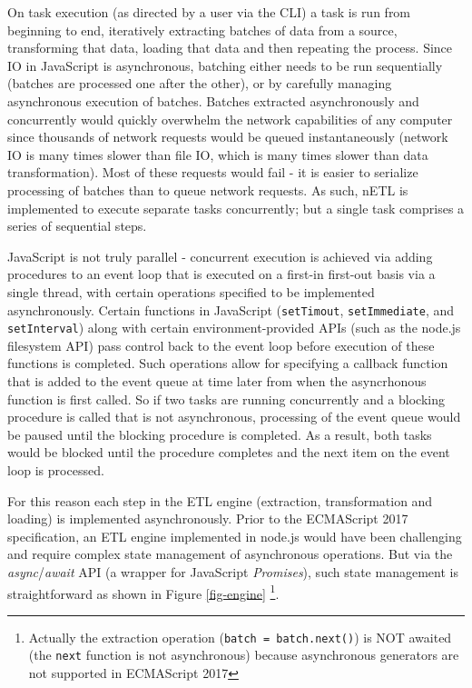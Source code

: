 On task execution (as directed by a user via the CLI) a task is run from beginning to end, iteratively extracting batches of data from a source, transforming that data, loading that data and then repeating the process. Since IO in JavaScript is asynchronous, batching either needs to be run sequentially (batches are processed one after the other), or by carefully managing asynchronous execution of batches. Batches extracted asynchronously and concurrently would quickly overwhelm the network capabilities of any computer since thousands of network requests would be queued instantaneously (network IO is many times slower than file IO, which is many times slower than data transformation). Most of these requests would fail - it is easier to serialize processing of batches than to queue network requests. As such, nETL is implemented to execute separate tasks concurrently; but a single task comprises a series of sequential steps.

JavaScript is not truly parallel - concurrent execution is achieved via adding procedures to an event loop that is executed on a first-in first-out basis via a single thread, with certain operations specified to be implemented asynchronously. Certain functions in JavaScript (\texttt{setTimout}, \texttt{setImmediate}, and \texttt{setInterval}) along with certain environment-provided APIs (such as the node.js filesystem API) pass control back to the event loop before execution of these functions is completed. Such operations allow for specifying a callback function that is added to the event queue at time later from when the asyncrhonous function is first called. So if two tasks are running concurrently and a blocking procedure is called that is not asynchronous, processing of the event queue would be paused until the blocking procedure is completed. As a result, both tasks would be blocked until the procedure completes and the next item on the event loop is processed.

For this reason each step in the ETL engine (extraction, transformation and loading) is implemented asynchronously. Prior to the ECMAScript 2017 specification, an ETL engine implemented in node.js would have been challenging and require complex state management of asynchronous operations. But via the \textit{async}/\textit{await} API (a wrapper for JavaScript \textit{Promises}), such state management is straightforward as shown in Figure \ref{fig-engine} \footnote{Actually the extraction operation (\texttt{batch = batch.next()}) is NOT awaited (the \texttt{next} function is not asynchronous) because asynchronous generators are not supported in ECMAScript 2017}.

